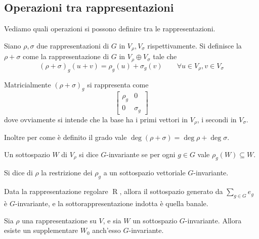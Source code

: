 \documentclass[a4paper,10pt,oneside]{math_article}
\DeclareMathOperator{\Reg}{R}
\begin{document}
  \subsection{Operazioni tra rappresentazioni}
    Vediamo quali operazioni si possono definire tra le rappresentazioni.
    
    \begin{mydef}
     Siano $\rho, \sigma$ due rappresentazioni di $G$ in $V_\rho,V_\sigma$ rispettivamente. Si definisce la  $\rho+\sigma$ come la rappresentazione di $G$ in $V_\rho\oplus V_\sigma$ tale che 
     \[
      (\rho+\sigma)_g(u+v)=\rho_g(u)+\sigma_g(v)\qquad \forall u\in V_\rho, v\in V_\sigma
     \]
    \end{mydef}
    
    Matricialmente $(\rho+\sigma)_g$ si rappresenta come
    \[
     \left[\begin{array}{c|c}
	    \rho_g & 0 \\
	    \hline
	    0 & \sigma_g
           \end{array}
     \right]
    \]
    dove ovviamente si intende che la base ha i primi vettori in $V_\rho$, i secondi in $V_\sigma$.
    
    Inoltre per come è definito il grado vale $\deg(\rho+\sigma)=\deg\rho+\deg\sigma$.
    
    \begin{mydef}
     Un sottospazio $W$ di $V_\rho$ si dice $G$-invariante se per ogni $g\in G$ vale $\rho_g(W)\subseteq W$.
    \end{mydef}

    \begin{mydef}
     Si dice  di $\rho$ la restrizione dei $\rho_g$ a un sottospazio vettoriale $G$-invariante.
    \end{mydef}
    
    \begin{myexample}
      Data la rappresentazione regolare $\Reg$, allora il sottospazio generato da $\sum_{g\in G} e_g$ è $G$-invariante, e la sottorappresentazione indotta è quella banale.
    \end{myexample}
    
    \begin{mytheorem}\label{Th:SupplInv}
     Sia $\rho$ una rappresentazione su $V$, e sia $W$ un sottospazio $G$-invariante. Allora esiste un supplementare $W_0$ anch'esso $G$-invariante.
    \end{mytheorem}
    
\end{document}
